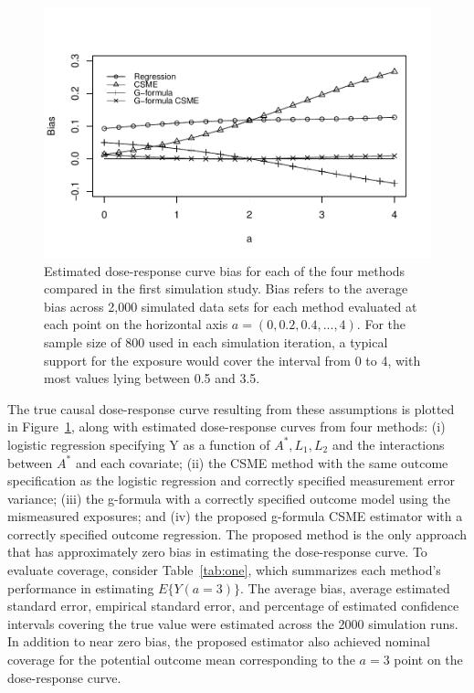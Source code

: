 \documentclass[useAMS,usenatbib,referee]{biom}
\begin{document}
\begin{figure}
\centering
\includegraphics[width=6in]{Paper1-fig2.pdf}
\caption{Estimated dose-response curve bias for each of the four methods compared in the first simulation study. Bias refers to the average bias across 2,000 simulated data sets for each method evaluated at each point on the horizontal axis $a = (0, 0.2, 0.4, ..., 4)$. For the sample size of 800 used in each simulation iteration, a typical support for the exposure would cover the interval from 0 to 4, with most values lying between 0.5 and 3.5.}
\label{fig:two}
\end{figure}

The true causal dose-response curve resulting from these assumptions is plotted in Figure~\ref{fig:two}, along with estimated dose-response curves from four methods: (i) logistic regression specifying Y as a function of $A^{*}, L_{1}, L_{2}$ and the interactions between $A^{*}$ and each covariate; (ii) the CSME method with the same outcome specification as the logistic regression and correctly specified measurement error variance; (iii) the g-formula with a correctly specified outcome model using the mismeasured exposures; and (iv) the proposed g-formula CSME estimator with a correctly specified outcome regression. The proposed method is the only approach that has approximately zero bias in estimating the dose-response curve. To evaluate coverage, consider Table~\ref{tab:one}, which summarizes each method's performance in estimating $E\{ Y(a = 3) \}$. The average bias, average estimated standard error, empirical standard error, and percentage of estimated confidence intervals covering the true value were estimated across the 2000 simulation runs. In addition to near zero bias, the proposed estimator also achieved nominal coverage for the potential outcome mean corresponding to the $a = 3$ point on the dose-response curve.
\end{document}
